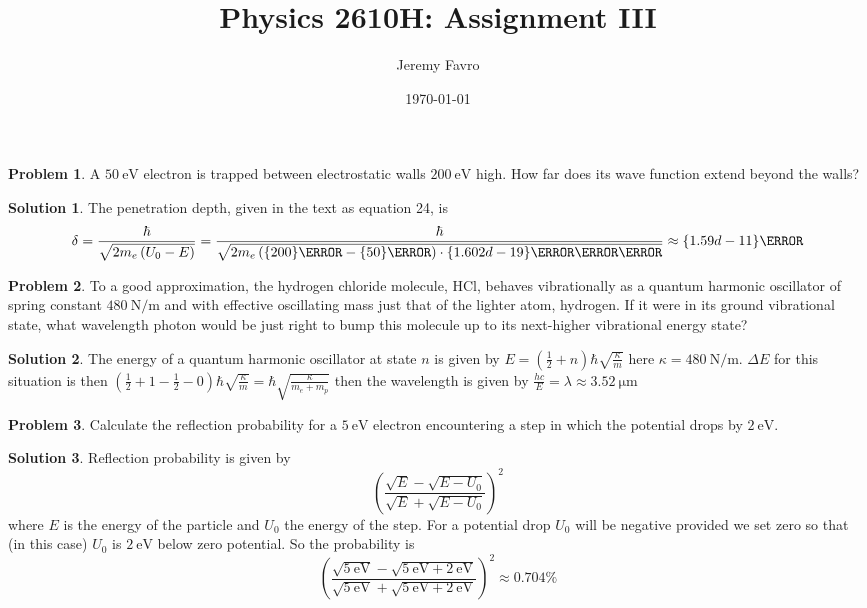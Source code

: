 \documentclass[10pt]{article}
\title{Physics 2610H: Assignment III}
\author{Jeremy Favro}
\date{\today}
\theoremstyle{definition}
\newtheorem{problem}{Problem}
\newtheorem{soln}{Solution}
\begin{document}
\maketitle

\begin{problem}
A $\qty{50}{\electronvolt}$ electron is trapped between electrostatic walls $\qty{200}{\electronvolt}$ high.
How far does its wave function extend beyond the walls?
\end{problem}
\begin{soln}
  The penetration depth, given in the text as equation 24, is
  $$\delta=\frac{\hbar}{\sqrt{2m_e\left(U_0-E\right)}}=\frac{\hbar}{\sqrt{2m_e\left(\qty{200}{\electronvolt}-\qty{50}{\electronvolt}\right)\cdot\qty{1.602d-19}{\joule\per\electronvolt}}}\approx\qty{1.59d-11}{\meter}$$
\end{soln}

\begin{problem}
To a good approximation, the hydrogen chloride molecule, HCl, behaves vibrationally as a quantum harmonic
oscillator of spring constant $\qty{480}{\newton\per\meter}$ and with effective oscillating mass just that of the lighter atom, hydrogen.
If it were in its ground vibrational state, what wavelength photon would be just right to bump this molecule up to its next-higher vibrational energy state?
\end{problem}
\begin{soln}
  The energy of a quantum harmonic oscillator at state $n$ is given by $E=\left(\frac{1}{2}+n\right)\hbar\sqrt{\frac{\kappa}{m}}$ here $\kappa=\qty{480}{\newton\per\meter}$.
  $\Delta E$ for this situation is then $\left(\frac{1}{2}+1-\frac{1}{2}-0\right)\hbar\sqrt{\frac{\kappa}{m}}=\hbar\sqrt{\frac{\kappa}{m_e+m_p}}$ then the wavelength is given by
  $\frac{hc}{E}=\lambda\approx\qty{3.52}{\micro\meter}$
\end{soln}

\begin{problem}
Calculate the reflection probability for a $\qty{5}{\electronvolt}$ electron encountering a step in which the potential drops by $\qty{2}{\electronvolt}$.
\end{problem}
\begin{soln}
  Reflection probability is given by
  $$\left(\frac{\sqrt{E}-\sqrt{E-U_0}}{\sqrt{E}+\sqrt{E-U_0}}\right)^2$$
  where $E$ is the energy of the particle and $U_0$ the energy of the step. For a potential drop
  $U_0$ will be negative provided we set zero so that (in this case) $U_0$ is $\qty{2}{\electronvolt}$ below zero potential. So the probability is
  $$\left(\frac{\sqrt{\qty{5}{\electronvolt}}-\sqrt{\qty{5}{\electronvolt}+\qty{2}{\electronvolt}}}{\sqrt{\qty{5}{\electronvolt}}+\sqrt{\qty{5}{\electronvolt}+\qty{2}{\electronvolt}}}\right)^2\approx0.704\%$$
\end{soln}
\end{document}
